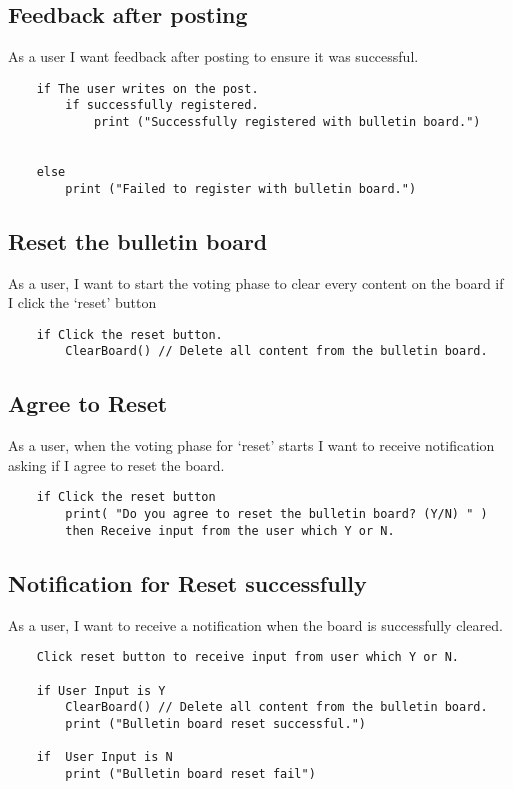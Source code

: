 \documentclass[conference]{IEEEtran}
\numberwithin{figure}{subsection}
\begin{document}
\subsection{Feedback after posting}
As a user I want feedback after posting to ensure it was successful.\\
\begin{lstlisting}
    if The user writes on the post.
        if successfully registered.
            print ("Successfully registered with bulletin board.")
            
    
    else
        print ("Failed to register with bulletin board.")
\end{lstlisting}


\subsection{Reset the bulletin board}
As a user, I want to start the voting phase to clear every content on the board if I click the ‘reset’ button\\
\begin{lstlisting}
    if Click the reset button.
	    ClearBoard() // Delete all content from the bulletin board.
\end{lstlisting}

\subsection{Agree to Reset}
 As a user, when the voting phase for ‘reset’ starts I want to receive notification asking if I agree to reset the board.\\
\begin{lstlisting}
    if Click the reset button
        print( "Do you agree to reset the bulletin board? (Y/N) " )
        then Receive input from the user which Y or N.
\end{lstlisting}

\subsection{Notification for Reset successfully}
As a user, I want to receive a notification when the board is successfully cleared.\\
\begin{lstlisting}
    Click reset button to receive input from user which Y or N.
    
    if User Input is Y
        ClearBoard() // Delete all content from the bulletin board.
        print ("Bulletin board reset successful.") 
        
    if  User Input is N
        print ("Bulletin board reset fail")
\end{lstlisting}
\end{document}
